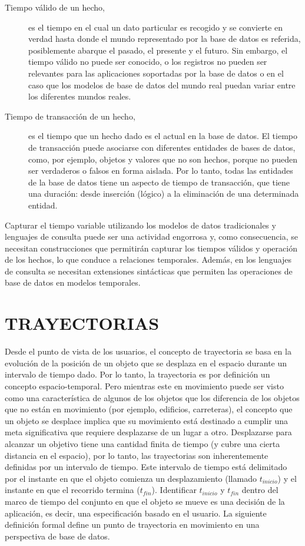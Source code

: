 \begin{description}
 \item [Tiempo válido de un hecho,] es el tiempo en el cual un dato particular es recogido y se convierte en verdad
 hasta donde el mundo representado por la base de datos es referida, 
posiblemente abarque el pasado, el presente y el futuro. Sin embargo, el tiempo válido no puede ser 
conocido, o los registros no pueden ser relevantes para las aplicaciones soportadas por la base de datos
o en el caso que los modelos de base de datos del  mundo real puedan variar entre los diferentes mundos reales.

\item [Tiempo de transacción de un hecho,] es el tiempo que un hecho dado es el actual en la base de datos. 
El tiempo de transacción puede asociarse con diferentes entidades de bases de datos, como, por ejemplo,
objetos y valores que no son hechos, porque no pueden ser verdaderos o falsos en forma aislada. Por lo tanto, todas las entidades de la base de datos tiene un aspecto de  tiempo de transacción, que tiene
una duración: desde inserción (lógico) a la eliminación de una determinada entidad.
\end{description}


Capturar el tiempo variable utilizando los modelos de datos tradicionales y lenguajes de consulta
puede ser una actividad engorrosa y, como consecuencia, se necesitan construcciones que permitirán
capturar los tiempos válidos y operación de los hechos, lo que conduce a relaciones temporales. Además,
en los lenguajes de consulta se necesitan  extensiones sintácticas que permiten las operaciones de base
de datos en modelos temporales.  \cite{yuzheng2011}

\section{TRAYECTORIAS}

Desde el punto de vista de los usuarios, el concepto de trayectoria se basa en la evolución de la posición de un 
objeto que se desplaza en el espacio durante un intervalo de tiempo dado. Por lo tanto, la trayectoria es por definición
un concepto espacio-temporal. Pero mientras este en movimiento puede ser visto como una característica de algunos de los
objetos que los diferencia de los objetos que no están en movimiento (por ejemplo, edificios, carreteras), el concepto que
un objeto se desplace implica que su movimiento está destinado a cumplir una meta significativa que requiere desplazarse
de un lugar a otro. Desplazarse para alcanzar un objetivo tiene una cantidad finita de tiempo (y cubre una cierta distancia
en el espacio), por lo tanto, las trayectorias son inherentemente definidas por un intervalo de tiempo. Este intervalo de
tiempo está delimitado por el instante en que el objeto comienza un desplazamiento (llamado $t_{inicio}$) y el instante en que
el recorrido termina ($t_{fin}$). Identificar $t_{inicio}$ y $t_{fin}$ dentro del  marco de tiempo del conjunto en que el objeto se mueve
es una decisión de la aplicación, es decir, una especificación basado en el usuario. La siguiente definición formal define
un punto de  trayectoria en movimiento en una perspectiva de base de datos.

